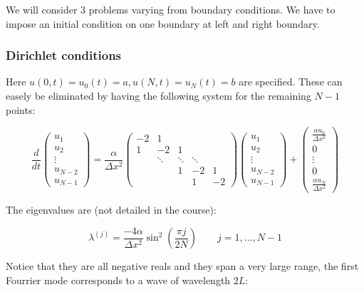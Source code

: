 We will consider 3 problems varying from boundary conditions. We have to impose an initial condition on one boundary at left and right boundary. 

\subsubsection{Dirichlet conditions} 

Here $u(0,t) = u_0(t) = a, u(N,t) = u_N(t) = b$ are specified. These can easely be eliminated by having the following system for the remaining $N-1$ points: 

\begin{equation}
\frac{d}{dt} \left(\begin{array}{c}
u_1\\
u_2 \\
\vdots\\
u_{N-2}\\
u_{N-1}
\end{array} \right) = \frac{\alpha }{\Delta x^2}
\left(
\begin{array}{ccccc}
-2 & 1  \\
1 & -2 & 1  \\
& \ddots & \ddots & \ddots \\
&  & 1 & -2 & 1\\
& & & 1& -2
\end{array}
\right)\left(\begin{array}{c}
u_1\\
u_2 \\
\vdots\\
u_{N-2}\\
u_{N-1}
\end{array} \right)
+
\left(\begin{array}{c}
\frac{\alpha u_0}{\Delta x^2}\\
0\\
\vdots\\
0\\
\frac{\alpha u_N}{\Delta x^2}
\end{array} \right)
\end{equation}

The eigenvalues are (not detailed in the course): 

\begin{equation}
\lambda ^{(j)} = \frac{-4\alpha}{\Delta x^2}\sin ^2 \left( \frac{\pi j}{2N} \right) \qquad j = 1,\dots ,N-1
\end{equation}

Notice that they are all negative reals and they span a very large range, the first Fourrier mode corresponds to a wave of wavelength $2L$:

